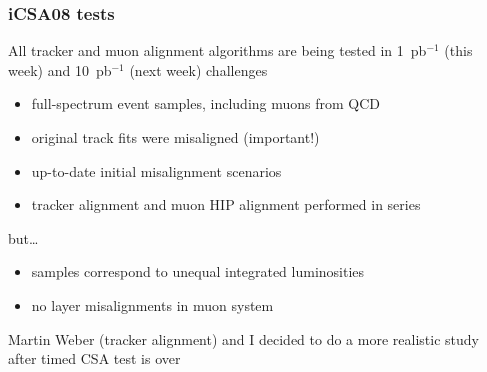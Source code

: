 \documentclass[compress]{beamer}
\begin{document}
\begin{frame}
\frametitle{iCSA08 tests}

All tracker and muon alignment algorithms are being tested in
1~pb$^{-1}$ (this week) and 10~pb$^{-1}$ (next week) challenges

\vspace{0.25 cm}
\begin{itemize}
\item full-spectrum event samples, including muons from QCD
\item original track fits were misaligned (important!)
\item up-to-date initial misalignment scenarios
\item tracker alignment and muon HIP alignment performed in series
\end{itemize}

but\ldots
\begin{itemize}
\item samples correspond to unequal integrated luminosities
\item no layer misalignments in muon system
\end{itemize}

\vfill
Martin Weber (tracker alignment) and I decided to do a more realistic
study after timed CSA test is over

\end{frame}
\end{document}
